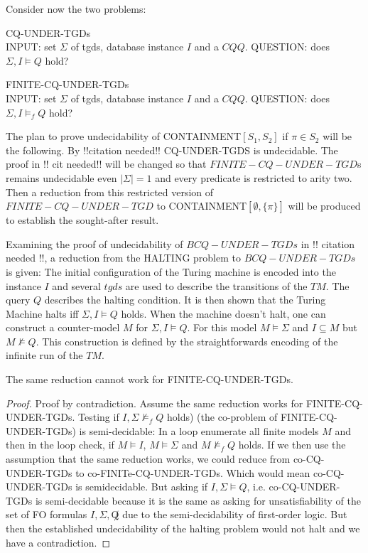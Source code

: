 Consider now the two problems:

\begin{framed}\noindent CQ-UNDER-TGDs\\
	INPUT: set $\Sigma$ of tgds, database instance $I$ and a $CQ Q$.
	QUESTION: does $\Sigma, I\models Q$ hold? 
\end{framed}
\begin{framed}\noindent FINITE-CQ-UNDER-TGDs\\
	INPUT: set $\Sigma$ of tgds, database instance $I$ and a $CQ Q$.
	QUESTION: does $\Sigma, I\models_f Q$ hold? 
\end{framed}
The plan to prove undecidability of CONTAINMENT$[S_1,S_2]$ if $\pi \in S_2$ will
be the following. By !!citation needed!! CQ-UNDER-TGDS is undecidable. The proof
in !! cit needed!! will be changed so that $FINITE-CQ-UNDER-TGD$s remains
undecidable even $|\Sigma| = 1$ and every predicate is restricted to arity two.
Then a reduction from this restricted version of $FINITE-CQ-UNDER-TGD$ to
CONTAINMENT$[\emptyset,\{\pi\}]$ will be produced to establish the sought-after
result.

Examining the proof of undecidability of $BCQ-UNDER-TGDs$ in !! citation needed
!!, a reduction from the HALTING problem to $BCQ-UNDER-TGDs$ is given: The
initial configuration of the Turing machine is encoded into the instance $I$ and
several $tgds$ are used to describe the transitions of the $TM$. The query $Q$
describes the halting condition.
It is then shown that the Turing Machine halts iff $\Sigma,I \models Q$ holds.
When the machine doesn't halt, one can construct a counter-model $M$ for
$\Sigma,I \models Q$. For this model $M \models \Sigma$ and $I \subseteq M$ but
$M \not \models Q$. This construction is defined by the straightforwards
encoding of the infinite run of the $TM$. 
\begin{proposition}
The same reduction cannot work for FINITE-CQ-UNDER-TGDs.
\end{proposition}

\begin{proof}
Proof by contradiction.	
Assume the same reduction works for FINITE-CQ-UNDER-TGDs.
Testing if $I,\Sigma \not\models_f Q$ holds) (the co-problem of
FINITE-CQ-UNDER-TGDs) is
semi-decidable:
In a loop enumerate all finite models $M$ and then in the loop check, if $M
\models I$, $M \models \Sigma$ and $M \not\models_f Q$ holds. If we then use the
assumption that the same reduction works, we could reduce from co-CQ-UNDER-TGDs
to co-FINITe-CQ-UNDER-TGDs. Which would mean co-CQ-UNDER-TGDs is semidecidable.
But asking if $I,\Sigma \models Q$, i.e. co-CQ-UNDER-TGDs is semi-decidable because it is the same as asking for unsatisfiability of the set of FO formulas $I,\Sigma,\not Q$ due to
the semi-decidability of first-order logic. But then the established
undecidability of the halting problem would not halt and we have a
contradiction.
\end{proof}

